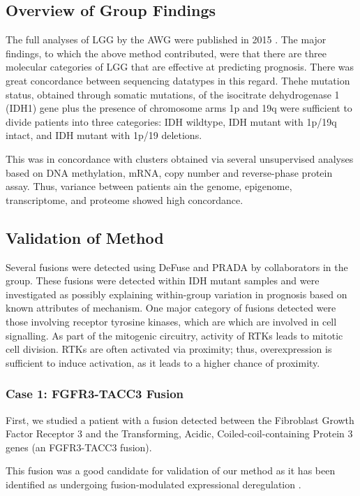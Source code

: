 \subsection{Overview of Group Findings}
The full analyses of LGG by the AWG were published in 2015 \cite{_comprehensive_2015}. The major findings, to which the above method contributed, were that there are three molecular categories of LGG that are effective at predicting prognosis. There was great concordance between sequencing datatypes in this regard. Thehe mutation status, obtained through somatic mutations, of the isocitrate dehydrogenase 1 (IDH1) gene plus the presence of chromosome arms 1p and 19q were sufficient to divide patients into three categories: IDH wildtype, IDH mutant with 1p/19q intact, and IDH mutant with 1p/19 deletions.

This was in concordance with clusters obtained via several unsupervised analyses based on DNA methylation, mRNA, copy number and reverse-phase protein assay. Thus, variance between patients ain the genome, epigenome, transcriptome, and proteome showed high concordance.

\subsection{Validation of Method}

Several fusions were detected using DeFuse\cite{mcpherson_defuse:_2011} and PRADA by collaborators in the group. These fusions were detected within IDH mutant samples and were investigated as possibly explaining within-group variation in prognosis based on known attributes of mechanism. One major category of fusions detected were those involving receptor tyrosine kinases, which are which are involved in cell signalling. As part of the mitogenic circuitry, activity of RTKs leads to mitotic cell division. RTKs are often activated via proximity; thus, overexpression is sufficient to induce activation, as it leads to a higher chance of proximity. 

\subsubsection{Case 1: FGFR3-TACC3 Fusion}

First, we studied a patient with a fusion detected between the Fibroblast Growth Factor Receptor 3 and the Transforming, Acidic, Coiled-coil-containing Protein 3 genes (an FGFR3-TACC3 fusion).

This fusion was a good candidate for validation of our method as it has been identified as undergoing fusion-modulated expressional deregulation \cite{parker_tumorigenic_2013}.

